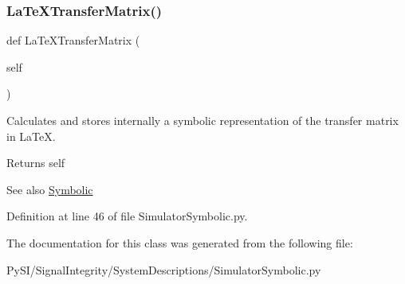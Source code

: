 \mbox{\label{classSignalIntegrity_1_1SystemDescriptions_1_1SimulatorSymbolic_1_1SimulatorSymbolic_adc83c150e43916083e3379cd4b9bb80e}} 
\subsubsection{\texorpdfstring{La\+Te\+X\+Transfer\+Matrix()}{LaTeXTransferMatrix()}}
{\footnotesize\ttfamily def La\+Te\+X\+Transfer\+Matrix (\begin{DoxyParamCaption}\item[{}]{self }\end{DoxyParamCaption})}



Calculates and stores internally a symbolic representation of the transfer matrix in La\+TeX. 

\begin{DoxyReturn}{Returns}
self 
\end{DoxyReturn}
\begin{DoxySeeAlso}{See also}
\hyperlink{namespaceSignalIntegrity_1_1SystemDescriptions_1_1Symbolic}{Symbolic} 
\end{DoxySeeAlso}


Definition at line 46 of file Simulator\+Symbolic.\+py.



The documentation for this class was generated from the following file\+:\begin{DoxyCompactItemize}
\item 
Py\+S\+I/\+Signal\+Integrity/\+System\+Descriptions/Simulator\+Symbolic.\+py\end{DoxyCompactItemize}
